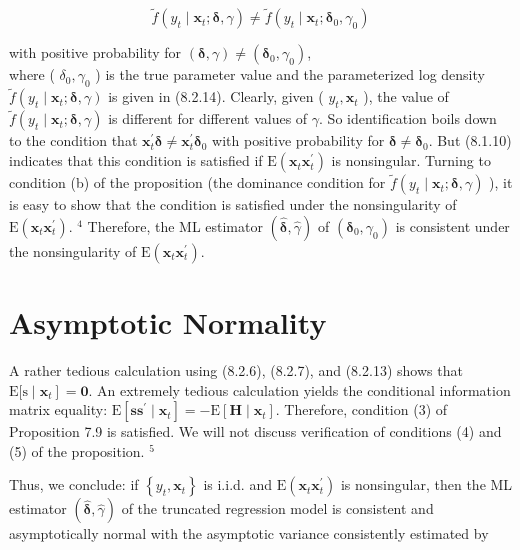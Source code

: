 \documentclass[10pt]{article}
\begin{document}
$$
\tilde{f}\left(y_{t} \mid \mathbf{x}_{t} ; \boldsymbol{\delta}, \gamma\right) \neq \tilde{f}\left(y_{t} \mid \mathbf{x}_{t} ; \boldsymbol{\delta}_{0}, \gamma_{0}\right)
$$

with positive probability for $(\boldsymbol{\delta}, \gamma) \neq\left(\boldsymbol{\delta}_{0}, \gamma_{0}\right)$,\\
where ( $\delta_{0}, \gamma_{0}$ ) is the true parameter value and the parameterized log density $\tilde{f}\left(y_{t} \mid\right. \left.\mathbf{x}_{t} ; \boldsymbol{\delta}, \gamma\right)$ is given in (8.2.14). Clearly, given ( $y_{t}, \mathbf{x}_{t}$ ), the value of $\tilde{f}\left(y_{t} \mid \mathbf{x}_{t} ; \boldsymbol{\delta}, \gamma\right)$ is different for different values of $\gamma$. So identification boils down to the condition that $\mathbf{x}_{t}^{\prime} \boldsymbol{\delta} \neq \mathbf{x}_{t}^{\prime} \boldsymbol{\delta}_{0}$ with positive probability for $\boldsymbol{\delta} \neq \boldsymbol{\delta}_{0}$. But (8.1.10) indicates that this condition is satisfied if $\mathrm{E}\left(\mathbf{x}_{t} \mathbf{x}_{t}^{\prime}\right)$ is nonsingular. Turning to condition (b) of the proposition (the dominance condition for $\tilde{f}\left(y_{t} \mid \mathbf{x}_{t} ; \boldsymbol{\delta}, \gamma\right)$ ), it is easy to show that the condition is satisfied under the nonsingularity of $\mathrm{E}\left(\mathbf{x}_{t} \mathbf{x}_{t}^{\prime}\right)$. ${ }^{4}$ Therefore, the ML estimator $(\hat{\boldsymbol{\delta}}, \hat{\gamma})$ of $\left(\boldsymbol{\delta}_{0}, \gamma_{0}\right)$ is consistent under the nonsingularity of $\mathrm{E}\left(\mathbf{x}_{t} \mathbf{x}_{t}^{\prime}\right)$.

\section*{Asymptotic Normality}
A rather tedious calculation using (8.2.6), (8.2.7), and (8.2.13) shows that $\mathrm{E}[\mathrm{s} \mid \left.\mathbf{x}_{t}\right]=\mathbf{0}$. An extremely tedious calculation yields the conditional information matrix equality: $\mathrm{E}\left[\mathbf{s s}^{\prime} \mid \mathbf{x}_{t}\right]=-\mathrm{E}\left[\mathbf{H} \mid \mathbf{x}_{t}\right]$. Therefore, condition (3) of Proposition 7.9 is satisfied. We will not discuss verification of conditions (4) and (5) of the proposition. ${ }^{5}$

Thus, we conclude: if $\left\{y_{t}, \mathbf{x}_{t}\right\}$ is i.i.d. and $\mathrm{E}\left(\mathbf{x}_{t} \mathbf{x}_{t}^{\prime}\right)$ is nonsingular, then the ML estimator $(\hat{\boldsymbol{\delta}}, \hat{\gamma})$ of the truncated regression model is consistent and asymptotically normal with the asymptotic variance consistently estimated by
\end{document}

